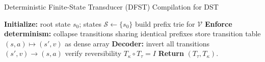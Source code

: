 \begin{algorithm}[t]
\caption{Deterministic Finite-State Transducer (DFST) Compilation for DST}
\label{alg:dst_dfst}
\BlankLine
\textbf{Initialize:} root state $s_0$; states $\mathcal{S}\!\leftarrow\!\{s_0\}$\;
build prefix trie for $\mathcal{V}$\;
\textbf{Enforce determinism:} collapse transitions sharing identical prefixes\;
store transition table $(s,a)\!\mapsto\!(s',v)$ as dense array\;
\textbf{Decoder:} invert all transitions $(s',v)\!\to\!(s,a)$\;
verify reversibility $T_\kappa\!\circ\!T_\tau=I$\;
\textbf{Return} $(T_\tau,T_\kappa)$.
\end{algorithm}



